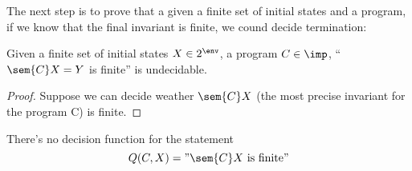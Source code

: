 The next step is to prove that a given a finite set of initial states
and a program, if we know that the final invariant is finite, we cound
decide termination:

\begin{lemma}
  Given a finite set of initial states \(X \in 2^\env\), a program
  \(C\in\imp\), ``\(\sem{C}X = Y\) is finite'' is undecidable.
\end{lemma}

\begin{proof}
  Suppose we can decide weather \(\sem{C}X\) (the most precise
  invariant for the program C) is finite.
\end{proof}

\begin{theorem}\label{th:finiteness}
  There's no decision function for the statement \[Q(C,X) = "\sem{C} X
  \text{ is finite}"\]
\end{theorem}
